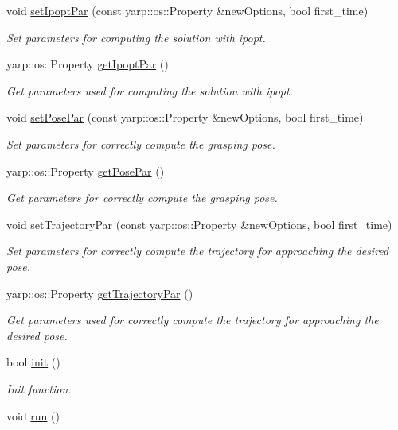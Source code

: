 \begin{DoxyCompactItemize}
\item 
void \hyperlink{classGraspComputation_a3ae446a26b1620933e071d3a538d742f}{set\+Ipopt\+Par} (const yarp\+::os\+::\+Property \&new\+Options, bool first\+\_\+time)
\begin{DoxyCompactList}\small\item\em Set parameters for computing the solution with ipopt. \end{DoxyCompactList}\item 
yarp\+::os\+::\+Property \hyperlink{classGraspComputation_afbad1962376bdf24b9376cf2c82e0e49}{get\+Ipopt\+Par} ()
\begin{DoxyCompactList}\small\item\em Get parameters used for computing the solution with ipopt. \end{DoxyCompactList}\item 
void \hyperlink{classGraspComputation_a76018ae7258adff6b2efa029fdf6f5dc}{set\+Pose\+Par} (const yarp\+::os\+::\+Property \&new\+Options, bool first\+\_\+time)
\begin{DoxyCompactList}\small\item\em Set parameters for correctly compute the grasping pose. \end{DoxyCompactList}\item 
yarp\+::os\+::\+Property \hyperlink{classGraspComputation_a55cdd807a70b178acc14e1a923ea2feb}{get\+Pose\+Par} ()
\begin{DoxyCompactList}\small\item\em Get parameters for correctly compute the grasping pose. \end{DoxyCompactList}\item 
void \hyperlink{classGraspComputation_a119b778fee99e973e0e9938ba90398a7}{set\+Trajectory\+Par} (const yarp\+::os\+::\+Property \&new\+Options, bool first\+\_\+time)
\begin{DoxyCompactList}\small\item\em Set parameters for correctly compute the trajectory for approaching the desired pose. \end{DoxyCompactList}\item 
yarp\+::os\+::\+Property \hyperlink{classGraspComputation_a9ec71cbbd2fe6165ed4b6d866d78d6be}{get\+Trajectory\+Par} ()
\begin{DoxyCompactList}\small\item\em Get parameters used for correctly compute the trajectory for approaching the desired pose. \end{DoxyCompactList}\item 
bool \hyperlink{classGraspComputation_ad8ea3d70e50ff4f4dbda6b03bcef77fa}{init} ()
\begin{DoxyCompactList}\small\item\em Init function. \end{DoxyCompactList}\item 
void \hyperlink{classGraspComputation_a6a63b1c79c125772f30eb5f82b8437ea}{run} ()\label{classGraspComputation_a6a63b1c79c125772f30eb5f82b8437ea}


\end{DoxyCompactItemize}

